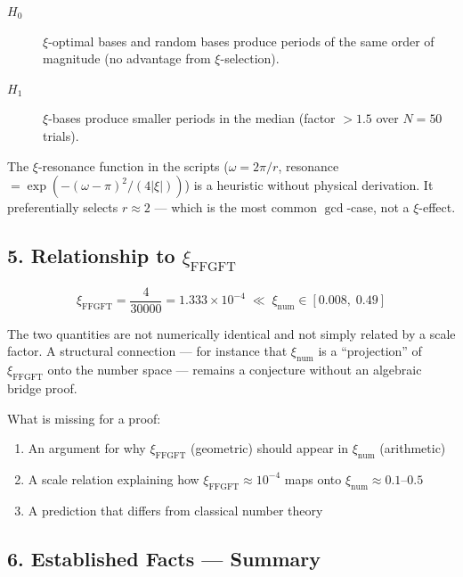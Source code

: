\begin{description}
\item[$H_0$] $\xi$-optimal bases and random bases produce periods of the same
order of magnitude (no advantage from $\xi$-selection).
\item[$H_1$] $\xi$-bases produce smaller periods in the median (factor $> 1.5$
over $N = 50$ trials).
\end{description}

\begin{mdframed}[style=warn]
The $\xi$-resonance function in the scripts
($\omega = 2\pi/r$, resonance $= \exp(-(\omega - \pi)^2 / (4|\xi|))$)
is a heuristic without physical derivation. It preferentially selects $r \approx 2$
— which is the most common $\gcd$-case, not a $\xi$-effect.
\end{mdframed}

\subsection*{5. Relationship to $\xi_\text{FFGFT}$}

\[
\xi_\text{FFGFT} = \frac{4}{30000} = 1.333 \times 10^{-4}
\;\ll\; \xi_\text{num} \in [0.008,\; 0.49]
\]

The two quantities are not numerically identical and not simply related by
a scale factor. A structural connection — for instance that $\xi_\text{num}$
is a ``projection'' of $\xi_\text{FFGFT}$ onto the number space — remains a
conjecture without an algebraic bridge proof.

What is missing for a proof:
\begin{enumerate}
\item An argument for why $\xi_\text{FFGFT}$ (geometric) should appear in
$\xi_\text{num}$ (arithmetic)
\item A scale relation explaining how $\xi_\text{FFGFT} \approx 10^{-4}$
maps onto $\xi_\text{num} \approx 0.1\text{--}0.5$
\item A prediction that differs from classical number theory
\end{enumerate}

\subsection*{6. Established Facts — Summary}

